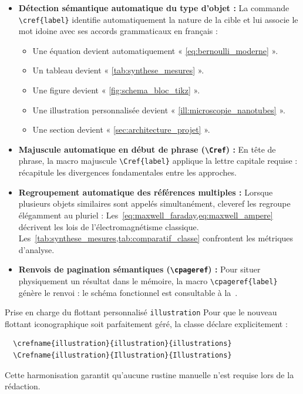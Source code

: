\begin{itemize}
  \item \textbf{Détection sémantique automatique du type d'objet :}
  La commande \texttt{\textbackslash cref\{label\}} identifie automatiquement la nature de la cible et lui associe le mot idoine avec ses accords grammaticaux en français :
  \begin{itemize}
    \item Une équation devient automatiquement « \cref{eq:bernoulli_moderne} ».
    \item Un tableau devient « \cref{tab:synthese_mesures} ».
    \item Une figure devient « \cref{fig:schema_bloc_tikz} ».
    \item Une illustration personnalisée devient « \cref{ill:microscopie_nanotubes} ».
    \item Une section devient « \cref{sec:architecture_projet} ».
  \end{itemize}

  \item \textbf{Majuscule automatique en début de phrase (\texttt{\textbackslash Cref}) :}
  En tête de phrase, la macro majuscule \texttt{\textbackslash Cref\{label\}} applique la lettre capitale requise :
   récapitule les divergences fondamentales entre les approches.

  \item \textbf{Regroupement automatique des références multiples :}
  Lorsque plusieurs objets similaires sont appelés simultanément, \textsf{cleveref} les regroupe élégamment au pluriel :
  Les~\cref{eq:maxwell_faraday,eq:maxwell_ampere} décrivent les lois de l'électromagnétisme classique.
  Les~\cref{tab:synthese_mesures,tab:comparatif_classe} confrontent les métriques d'analyse.

  \item \textbf{Renvois de pagination sémantiques (\texttt{\textbackslash cpageref}) :}
  Pour situer physiquement un résultat dans le mémoire, la macro \texttt{\textbackslash cpageref\{label\}} génère le renvoi :
  le schéma fonctionnel est consultable à la~.
\end{itemize}

\begin{boiteSynthese}{Prise en charge du flottant personnalisé \texttt{illustration}}
  Pour que le nouveau flottant iconographique soit parfaitement géré, la classe déclare explicitement :
  \begin{verbatim}
  \crefname{illustration}{illustration}{illustrations}
  \Crefname{illustration}{Illustration}{Illustrations}
  \end{verbatim}
  Cette harmonisation garantit qu'aucune rustine manuelle n'est requise lors de la rédaction.
\end{boiteSynthese}

